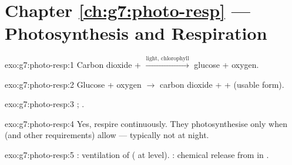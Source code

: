 \section*{Chapter \ref{ch:g7:photo-resp} --- Photosynthesis and Respiration}

\begin{solution}{exo:g7:photo-resp:1}
Carbon dioxide +  $\xrightarrow{\text{light, chlorophyll}}$
glucose + oxygen.
\end{solution}

\begin{solution}{exo:g7:photo-resp:2}
Glucose + oxygen $\to$ carbon dioxide +  +  (usable form).
\end{solution}

\begin{solution}{exo:g7:photo-resp:3}
; .
\end{solution}

\begin{solution}{exo:g7:photo-resp:4}
Yes,  respire continuously. They photosynthesise only when 
(and other requirements) allow --- typically not at night.
\end{solution}

\begin{solution}{exo:g7:photo-resp:5}
: ventilation of  ( at  level).
: chemical  release from  in .
\end{solution}

